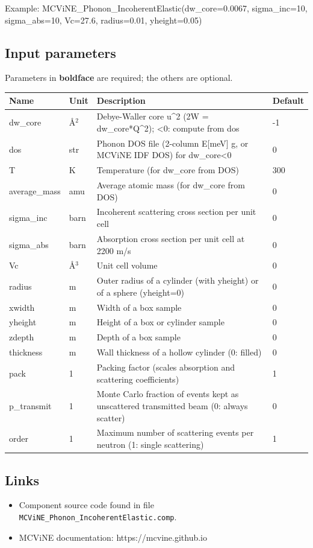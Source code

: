 Example: MCViNE\_Phonon\_IncoherentElastic(dw\_core=0.0067, sigma\_inc=10, sigma\_abs=10, Vc=27.6, radius=0.01, yheight=0.05)

\subsection*{Input parameters}
Parameters in \textbf{boldface} are required; the others are optional.

\begin{longtable}{p{}p{}p{}p{}}
\toprule
\textbf{Name} & \textbf{Unit} & \textbf{Description} & \textbf{Default} \\
\midrule
\endhead
dw\_core & \AA{}$^{2}$ & Debye-Waller core u\textasciicircum{}2 (2W = dw\_core*Q\textasciicircum{}2); \textless{}0: compute from dos & -1 \\
dos & str & Phonon DOS file (2-column E[meV] g, or MCViNE IDF DOS) for dw\_core\textless{}0 & 0 \\
T & K & Temperature (for dw\_core from DOS) & 300 \\
average\_mass & amu & Average atomic mass (for dw\_core from DOS) & 0 \\
sigma\_inc & barn & Incoherent scattering cross section per unit cell & 0 \\
sigma\_abs & barn & Absorption cross section per unit cell at 2200 m/s & 0 \\
Vc & \AA{}$^{3}$ & Unit cell volume & 0 \\
radius & m & Outer radius of a cylinder (with yheight) or of a sphere (yheight=0) & 0 \\
xwidth & m & Width of a box sample & 0 \\
yheight & m & Height of a box or cylinder sample & 0 \\
zdepth & m & Depth of a box sample & 0 \\
thickness & m & Wall thickness of a hollow cylinder (0: filled) & 0 \\
pack & 1 & Packing factor (scales absorption and scattering coefficients) & 1 \\
p\_transmit & 1 & Monte Carlo fraction of events kept as unscattered transmitted beam (0: always scatter) & 0 \\
order & 1 & Maximum number of scattering events per neutron (1: single scattering) & 1 \\
\bottomrule
\end{longtable}

\subsection*{Links}
\begin{itemize}
  \item Component source code found in file \texttt{MCViNE\_Phonon\_IncoherentElastic.comp}.
  \item MCViNE documentation: https://mcvine.github.io
\end{itemize}
